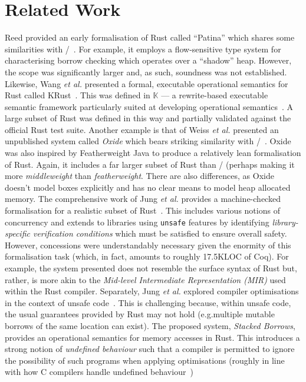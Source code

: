 \section{Related Work}


Reed provided an early formalisation of Rust called ``Patina'' which
shares some similarities with \FR/~\cite{Reed15}.  For example, it
employs a flow-sensitive type system for characterising borrow
checking which operates over a ``shadow'' heap.  However, the scope
was significantly larger and, as such, soundness was not established.
Likewise, Wang {\em et al.} presented a formal, executable operational
semantics for Rust called KRust~\cite{WSZZZ18}.  This was defined in
$\mathbb{K}$ --- a rewrite-based executable semantic framework
particularly suited at developing operational semantics~\cite{RS10b}.
A large subset of Rust was defined in this way and partially validated
against the official Rust test suite.  Another example is that of
Weiss {\em et al.} presented an unpublished system called {\em Oxide}
which bears striking similarity with \FR/~\cite{WPMA19}.  Oxide was
also inspired by Featherweight Java to produce a relatively lean
formalisation of Rust.  Again, it includes a far larger subset of Rust
than \FR/ (perhaps making it more {\em middleweight} than {\em
  featherweight}.  There are also differences, as Oxide doesn't model
boxes explicitly and has no clear means to model heap allocated
memory.  The comprehensive work of Jung {\em et al.} provides a
machine-checked formalisation for a realistic subset of
Rust~\cite{JJKD18}.  This includes various notions of concurrency and
extends to libraries using \lstinline{unsafe} features by identifying
{\em library-specific verification conditions} which must be satisfied
to ensure overall safety.  However, concessions were understandably
necessary given the enormity of this formalisation task (which, in
fact, amounts to roughly 17.5KLOC of Coq).  For example, the system
presented does not resemble the surface syntax of Rust but, rather, is
more akin to the {\em Mid-level Intermediate Representation (MIR)}
used within the Rust compiler.  Separately, Jung {\em et al.} explored
compiler optimisations in the context of unsafe code~\cite{JDKJD20}.
This is challenging because, within unsafe code, the usual guarantees
provided by Rust may not hold (e.g.multiple mutable borrows of the
same location can exist).  The proposed system, {\em Stacked Borrows},
provides an operational semantics for memory accesses in Rust.  This
introduces a strong notion of {\em undefined behaviour} such that a
compiler is permitted to ignore the possibility of such programs when
applying optimisations (roughly in line with how C compilers handle
undefined behaviour~\cite{MGDKRWS19})


